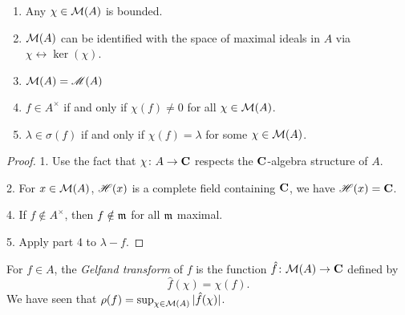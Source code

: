 \begin{lemma}
\leavevmode
\begin{enumerate}
\item
Any $\chi\in \mathcal{M}(A)$ is bounded.

\item
$\mathcal{M}(A)$ can be identified with the space of maximal ideals in $A$ via 
$\chi\leftrightarrow \ker(\chi)$. 

\item
$\mathcal{M}(A)=\operatorname{\mathscr{M}}(A)$

\item
$f\in A^\times$ if and only if $\chi(f)\ne 0$ for all $\chi\in \mathcal{M}(A)$. 

\item
$\lambda\in \sigma(f)$ if and only if $\chi(f)=\lambda$ for some 
$\chi\in \mathcal{M}(A)$. 
\end{enumerate}
\end{lemma}
\begin{proof}
1. Use the fact that $\chi\colon A\to \mathbf{C}$ respects the $\mathbf{C}$-algebra structure 
of $A$. 

2. For $x\in \mathcal{M}(A)$, $\mathscr{H}(x)$ is a complete field containing $\mathbf{C}$, we have 
$\mathscr{H}(x)=\mathbf{C}$. 

4. If $f\notin A^\times$, then $f\notin \mathfrak{m}$ for all $\mathfrak{m}$ maximal. 

5. Apply part 4 to $\lambda-f$. 
\end{proof}

For $f\in A$, the \emph{Gelfand transform} of $f$ is the function 
$\hat f\colon \mathcal{M}(A)\to \mathbf{C}$ defined by 
\[
  \hat f(\chi) = \chi(f) .
\]
We have seen that $\rho(f) = \sup_{\chi\in \mathcal{M}(A)} |\hat f(\chi)|$. 
